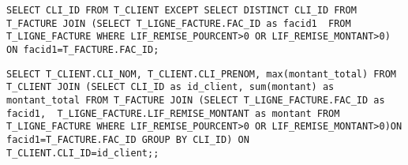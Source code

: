 
\begin{lstlisting}
SELECT CLI_ID FROM T_CLIENT EXCEPT SELECT DISTINCT CLI_ID FROM T_FACTURE JOIN (SELECT T_LIGNE_FACTURE.FAC_ID as facid1  FROM T_LIGNE_FACTURE WHERE LIF_REMISE_POURCENT>0 OR LIF_REMISE_MONTANT>0) ON facid1=T_FACTURE.FAC_ID;
\end{lstlisting}



\begin{lstlisting}
SELECT T_CLIENT.CLI_NOM, T_CLIENT.CLI_PRENOM, max(montant_total) FROM T_CLIENT JOIN (SELECT CLI_ID as id_client, sum(montant) as montant_total FROM T_FACTURE JOIN (SELECT T_LIGNE_FACTURE.FAC_ID as facid1,  T_LIGNE_FACTURE.LIF_REMISE_MONTANT as montant FROM T_LIGNE_FACTURE WHERE LIF_REMISE_POURCENT>0 OR LIF_REMISE_MONTANT>0)ON facid1=T_FACTURE.FAC_ID GROUP BY CLI_ID) ON T_CLIENT.CLI_ID=id_client;;
\end{lstlisting}





